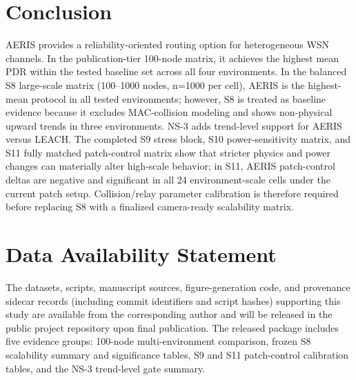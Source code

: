 \documentclass[sensors,article,submit,moreauthors,pdftex]{Definitions/mdpi}
\begin{document}
\section{Conclusion}
AERIS provides a reliability-oriented routing option for heterogeneous WSN channels. In the publication-tier 100-node matrix, it achieves the highest mean PDR within the tested baseline set across all four environments. In the balanced S8 large-scale matrix (100--1000 nodes, n=1000 per cell), AERIS is the highest-mean protocol in all tested environments; however, S8 is treated as baseline evidence because it excludes MAC-collision modeling and shows non-physical upward trends in three environments. NS-3 adds trend-level support for AERIS versus LEACH. The completed S9 stress block, S10 power-sensitivity matrix, and S11 fully matched patch-control matrix show that stricter physics and power changes can materially alter high-scale behavior; in S11, AERIS patch-control deltas are negative and significant in all 24 environment-scale cells under the current patch setup. Collision/relay parameter calibration is therefore required before replacing S8 with a finalized camera-ready scalability matrix.

\section*{Data Availability Statement}
The datasets, scripts, manuscript sources, figure-generation code, and provenance sidecar records (including commit identifiers and script hashes) supporting this study are available from the corresponding author and will be released in the public project repository upon final publication. The released package includes five evidence groups: 100-node multi-environment comparison, frozen S8 scalability summary and significance tables, S9 and S11 patch-control calibration tables, and the NS-3 trend-level gate summary.


\end{document}
